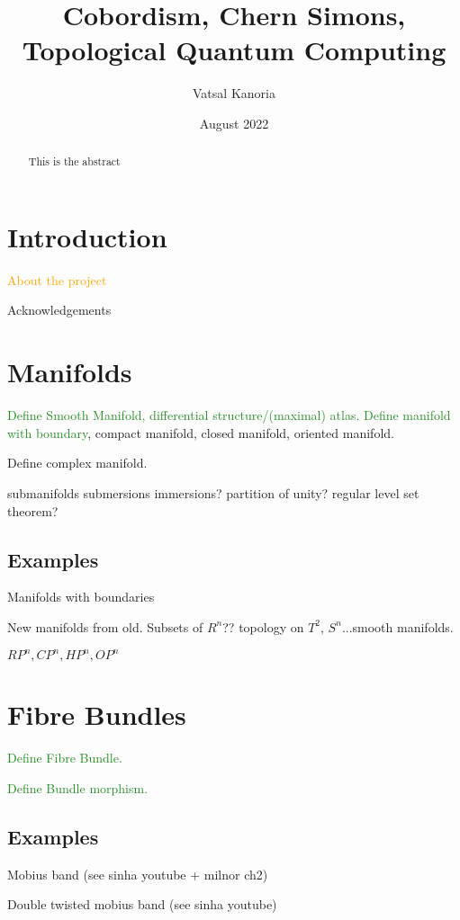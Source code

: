\documentclass[a4paper]{article}
\theoremstyle{definition} \newtheorem*{definition}{Definition}
\theoremstyle{definition} \newtheorem*{definitions}{Definitions}
\theoremstyle{plain} \newtheorem{theorem}{Theorem}[section]
\theoremstyle{plain} \newtheorem{proposition}[theorem]{Proposition}
\theoremstyle{plain} \newtheorem{corollary}[theorem]{Corollary}
\theoremstyle{plain} \newtheorem{lemma}[theorem]{Lemma}
\theoremstyle{plain} \newtheorem{example}[theorem]{Example}
\newcommand{\done}[1]{\textcolor{ForestGreen}{#1}}
\newcommand{\finish}[1]{\textcolor{orange}{#1}}
\begin{document}
\title{Cobordism, Chern Simons, Topological Quantum Computing}
\author{Vatsal Kanoria}
\date{August 2022}
\maketitle
\begin{abstract}
This is the abstract
\end{abstract}
\tableofcontents

\section{Introduction}

\finish{About the project}

Acknowledgements

\section{Manifolds}

\done{Define Smooth Manifold, differential structure/(maximal) atlas.
Define manifold with boundary}, 
compact manifold, closed manifold, oriented manifold.

Define complex manifold.

submanifolds submersions immersions? partition of unity? regular level set theorem?

\subsection{Examples}

Manifolds with boundaries

New manifolds from old. Subsets of $R^n$??
topology on $T^2$, $S^n$...smooth manifolds.

$RP^n, CP^n, HP^n, OP^n$

\section{Fibre Bundles}

\done{Define Fibre Bundle.}

\done{Define Bundle morphism.}

\subsection{Examples}
Mobius band (see sinha youtube + milnor ch2)

Double twisted mobius band (see sinha youtube)
\end{document}
